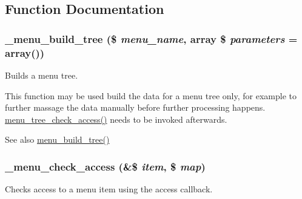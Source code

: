 \subsection{Function Documentation}
\hypertarget{group__menu_ga036009a003a68a01a420737d9c1b30c0}{
\subsubsection[{\_\-menu\_\-build\_\-tree}]{\setlength{\rightskip}{0pt plus 5cm}\_\-menu\_\-build\_\-tree (\$ {\em menu\_\-name}, \/  array \$ {\em parameters} = {\ttfamily array()})}}
\label{group__menu_ga036009a003a68a01a420737d9c1b30c0}
Builds a menu tree.

This function may be used build the data for a menu tree only, for example to further massage the data manually before further processing happens. \hyperlink{group__menu_ga6374db210d96026fb70431def083a7a5}{menu\_\-tree\_\-check\_\-access()} needs to be invoked afterwards.

\begin{DoxySeeAlso}{See also}
\hyperlink{group__menu_gabd17638ed8a36d5412244fd7c2456eb7}{menu\_\-build\_\-tree()} 
\end{DoxySeeAlso}
\hypertarget{group__menu_ga255e3052e7679155b37b82d9bcbe19c9}{
\subsubsection[{\_\-menu\_\-check\_\-access}]{\setlength{\rightskip}{0pt plus 5cm}\_\-menu\_\-check\_\-access (\&\$ {\em item}, \/  \$ {\em map})}}
\label{group__menu_ga255e3052e7679155b37b82d9bcbe19c9}
Checks access to a menu item using the access callback.


